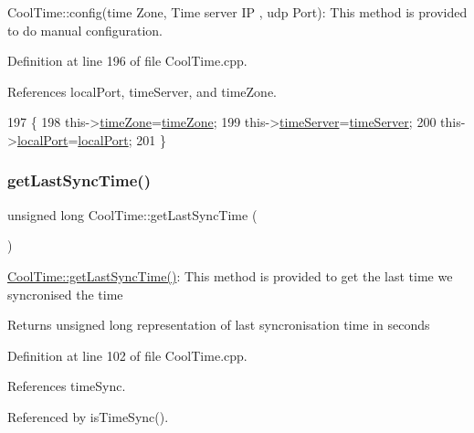Cool\+Time\+::config(time Zone, Time server I\+P , udp Port)\+: This method is provided to do manual configuration. 

Definition at line 196 of file Cool\+Time.\+cpp.



References local\+Port, time\+Server, and time\+Zone.


\begin{DoxyCode}
197 \{
198     this->\hyperlink{classCoolTime_a1916d98810c2a4e9ba72867e8c1b9a99}{timeZone}=\hyperlink{classCoolTime_a1916d98810c2a4e9ba72867e8c1b9a99}{timeZone};
199     this->\hyperlink{classCoolTime_ad2b9858f399108cb440dd1e908916f04}{timeServer}=\hyperlink{classCoolTime_ad2b9858f399108cb440dd1e908916f04}{timeServer};
200     this->\hyperlink{classCoolTime_a2f777da44d7ba678be8185299e9b49d1}{localPort}=\hyperlink{classCoolTime_a2f777da44d7ba678be8185299e9b49d1}{localPort};
201 \} 
\end{DoxyCode}
\mbox{\label{classCoolTime_a5d17f707a9d337720493b2bce9d41c21}} 
\subsubsection{\texorpdfstring{get\+Last\+Sync\+Time()}{getLastSyncTime()}}
{\footnotesize\ttfamily unsigned long Cool\+Time\+::get\+Last\+Sync\+Time (\begin{DoxyParamCaption}{ }\end{DoxyParamCaption})}

\hyperlink{classCoolTime_a5d17f707a9d337720493b2bce9d41c21}{Cool\+Time\+::get\+Last\+Sync\+Time()}\+: This method is provided to get the last time we syncronised the time

\begin{DoxyReturn}{Returns}
unsigned long representation of last syncronisation time in seconds 
\end{DoxyReturn}


Definition at line 102 of file Cool\+Time.\+cpp.



References time\+Sync.



Referenced by is\+Time\+Sync().


